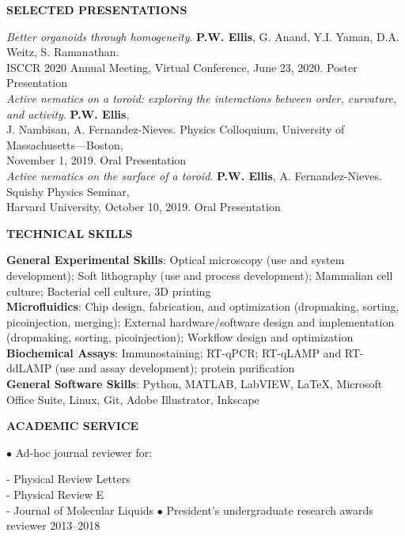 \documentclass[10pt]{article}
\newenvironment{changemargin}[2]{%
  \list{}{\rightmargin#2\leftmargin#1
    \parsep=0pt\topsep=1pt\partopsep=0pt}
\item[]} {\endlist}
\newenvironment{indentmore}{\begin{changemargin}{10pt}{0cm}}{\end{changemargin}}
\begin{document}
\textbf{\large SELECTED PRESENTATIONS}
\begin{indentmore}
\emph{Better organoids through homogeneity}. \textbf{P.W. Ellis}, G. Anand, Y.I. Yaman, D.A. Weitz, S. Ramanathan. \\ \hspace*{15pt} ISCCR 2020 Annual Meeting, Virtual Conference, June 23, 2020. Poster Presentation\\

\emph{Active nematics on a toroid: exploring the interactions between order, curvature, and activity}. \textbf{P.W. Ellis}, \\ \hspace*{15pt} J. Nambisan, A. Fernandez-Nieves. Physics Colloquium, University of Massachusetts---Boston, \\ \hspace*{15pt} November 1, 2019. Oral Presentation\\

\emph{Active nematics on the surface of a toroid}. \textbf{P.W. Ellis}, A. Fernandez-Nieves. Squishy Physics Seminar, \\ \hspace*{15pt} Harvard University, October 10, 2019. Oral Presentation\\
\end{indentmore}


\textbf{\large TECHNICAL SKILLS}
\begin{indentmore}
{\bf General Experimental Skills}: Optical microscopy (use and system development); Soft lithography (use and process development); Mammalian cell culture; Bacterial cell culture, 3D printing\\
{\bf Microfluidics}: Chip design, fabrication, and optimization (dropmaking, sorting, picoinjection, merging); External hardware/software design and implementation (dropmaking, sorting, picoinjection); Workflow design and optimization\\
{\bf Biochemical Assays}: Immunostaining; RT-qPCR; RT-qLAMP and RT-ddLAMP (use and assay development); protein purification\\
{\bf General Software Skills}: Python, MATLAB, LabVIEW, \LaTeX, Microsoft Office Suite, Linux, Git, Adobe Illustrator, Inkscape\\
\end{indentmore}


\textbf{\large ACADEMIC SERVICE}
\begin{indentmore}
\begin{indentmore}
$\bullet$ Ad-hoc journal reviewer for:
\begin{indentmore}
- Physical Review Letters\\
- Physical Review E\\
- Journal of Molecular Liquids
\end{indentmore}
$\bullet$ President's undergraduate research awards reviewer \hfill 2013--2018
\end{indentmore}
\end{indentmore}
\end{document}
